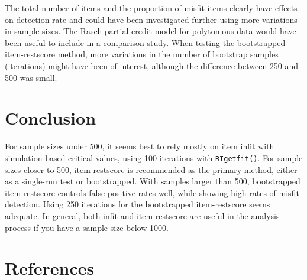 \documentclass[
  letterpaper,
  DIV=11,
  numbers=noendperiod]{scrartcl}
\begin{document}
The total number of items and the proportion of misfit items clearly
have effects on detection rate and could have been investigated further
using more variations in sample sizes. The Rasch partial credit model
for polytomous data would have been useful to include in a comparison
study. When testing the bootstrapped item-restscore method, more
variations in the number of bootstrap samples (iterations) might have
been of interest, although the difference between 250 and 500 was small.

\section{Conclusion}\label{conclusion}

For sample sizes under 500, it seems best to rely mostly on item infit
with simulation-based critical values, using 100 iterations with
\texttt{RIgetfit()}. For sample sizes closer to 500, item-restscore is
recommended as the primary method, either as a single-run test or
bootstrapped. With samples larger than 500, bootstrapped item-restscore
controls false positive rates well, while showing high rates of misfit
detection. Using 250 iterations for the bootstrapped item-restscore
seems adequate. In general, both infit and item-restscore are useful in
the analysis process if you have a sample size below 1000.

\section*{References}\label{references}
\end{document}
